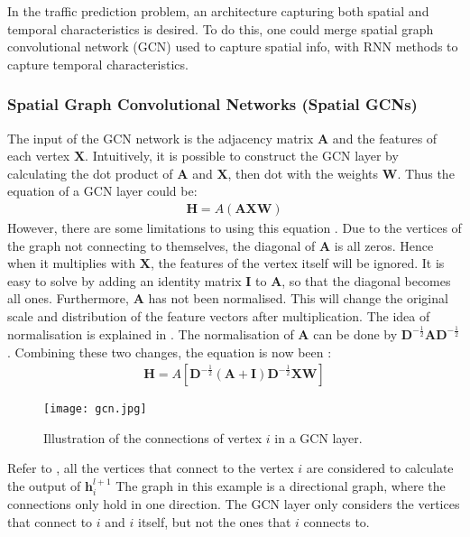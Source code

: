 In the traffic prediction problem, an architecture capturing both spatial and temporal characteristics is desired. 
To do this, one could merge spatial graph convolutional network (GCN) used to capture spatial info, with RNN methods to capture temporal characteristics.

\subsubsection{Spatial Graph Convolutional Networks (Spatial GCNs)}

The input of the GCN network is the adjacency matrix $\mathbf{A}$ and the features of each vertex $\mathbf{X}$. 
Intuitively, it is possible to construct the GCN layer by calculating the dot product of $\mathbf{A}$ and $\mathbf{X}$, then dot with the weights $\mathbf{W}$. 
Thus the equation of a GCN layer could be:
\begin{gather}
    \mathbf{H} = A(\mathbf{AXW})
\end{gather}
However, there are some limitations to using this equation \cite{Thomas}. 
Due to the vertices of the graph not connecting to themselves, the diagonal of $\mathbf{A}$ is all zeros. Hence when it multiplies with $\mathbf{X}$, the features of the vertex itself will be ignored. 
It is easy to solve by adding an identity matrix $\mathbf{I}$ to $\mathbf{A}$, so that the diagonal becomes all ones. 
Furthermore, $\mathbf{A}$ has not been normalised. This will change the original scale and distribution of the feature vectors after multiplication. The idea of normalisation is explained in . 
The normalisation of $\mathbf{A}$ can be done by $\mathbf{D}^{-\frac{1}{2}}\mathbf{AD}^{-\frac{1}{2}}$. Combining these two changes, the equation is now been \cite{Kipf2016SemiSupervisedCW}:
\begin{gather} 
    \mathbf{H} = A\left[\mathbf{D}^{-\frac{1}{2}}(\mathbf{A} + \mathbf{I})\mathbf{D}^{-\frac{1}{2}}\mathbf{XW}\right] \label{eq:gcn}
\end{gather}

\begin{figure}[!htb]
    \centering
    \texttt{[image: gcn.jpg]}
    \caption{Illustration of the connections of vertex $i$ in a GCN layer.}
    \label{Figure:gcn-structure}
\end{figure}

Refer to , all the vertices that connect to the vertex $i$ are considered to calculate the output of $\mathbf{h}_i^{l+1}$
The graph in this example is a directional graph, where the connections only hold in one direction. The GCN layer only considers the vertices that connect to $i$ and $i$ itself, but not the ones that $i$ connects to.

